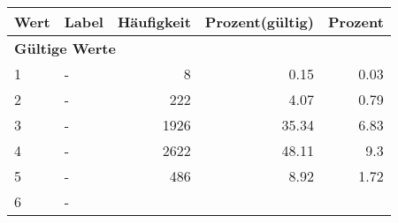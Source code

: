      \begin{longtable}{lXrrr}
     \toprule
     \textbf{Wert} & \textbf{Label} & \textbf{Häufigkeit} & \textbf{Prozent(gültig)} & \textbf{Prozent} \\
     \endhead
     \midrule
     \multicolumn{5}{l}{\textbf{Gültige Werte}}\\

     1 &
     \multicolumn{1}{X}{ -  } &


       \num{8} &
       \num[round-mode=places,round-precision=2]{0,15} &
         \num[round-mode=places,round-precision=2]{0,03} \\

     2 &
     \multicolumn{1}{X}{ -  } &


       \num{222} &
       \num[round-mode=places,round-precision=2]{4,07} &
         \num[round-mode=places,round-precision=2]{0,79} \\

     3 &
     \multicolumn{1}{X}{ -  } &


       \num{1926} &
       \num[round-mode=places,round-precision=2]{35,34} &
         \num[round-mode=places,round-precision=2]{6,83} \\

     4 &
     \multicolumn{1}{X}{ -  } &


       \num{2622} &
       \num[round-mode=places,round-precision=2]{48,11} &
         \num[round-mode=places,round-precision=2]{9,3} \\

     5 &
     \multicolumn{1}{X}{ -  } &


       \num{486} &
       \num[round-mode=places,round-precision=2]{8,92} &
         \num[round-mode=places,round-precision=2]{1,72} \\

     6 &
     \multicolumn{1}{X}{ -  } &



\end{longtable}
